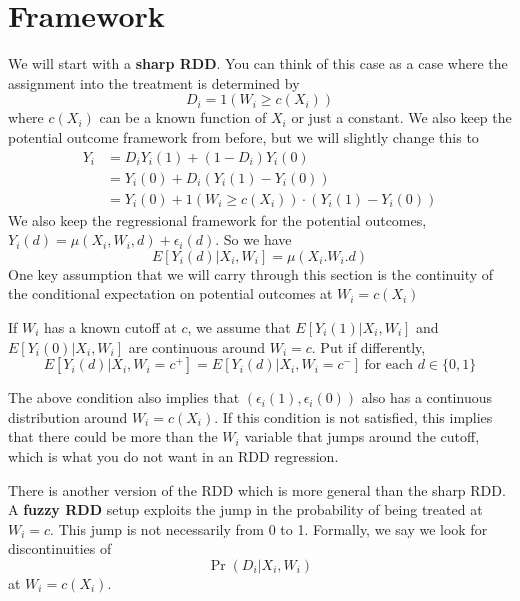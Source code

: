 \section{Framework}
We will start with a \textbf{sharp RDD}. You can think of this case as a case where the assignment into the treatment is determined by
\[
D_i=1(W_i\geq c(X_i))
\]
where $c(X_i)$ can be a known function of $X_i$ or just a constant. We also keep the potential outcome framework from before, but we will slightly change this to
\begin{align*}
Y_i& = D_iY_i(1)+(1-D_i)Y_i(0)\\
&=Y_i(0)+D_i(Y_i(1)-Y_i(0))\\
&=Y_i(0)+1(W_i\geq c(X_i))\cdot(Y_i(1)-Y_i(0))
\end{align*}
We also keep the regressional framework for the potential outcomes, $Y_i(d)=\mu(X_i,W_i,d)+\epsilon_i(d)$. So we have
\[
E[Y_i(d)|X_i,W_i]=\mu(X_i.W_i.d)
\]
One key assumption that we will carry through this section is the continuity of the conditional expectation on potential outcomes at $W_i=c(X_i)$
\begin{mdframed}[backgroundcolor=blue!5] 
\begin{assumption}[Continuity of $\mu(X_i,W_i,d)$ at $W_i=c$] If $W_i$ has a known cutoff at $c$, we assume that $E[Y_i(1)|X_i, W_i]$ and $E[Y_i(0)|X_i, W_i]$ are continuous around $W_i=c$. Put if differently, 
\[
E[Y_i(d)|X_i, W_i=c^+]=E[Y_i(d)|X_i, W_i=c^-] \ \text{for each } d\in\{0,1\}
\]
\end{assumption}
\end{mdframed}
The above condition also implies that $(\epsilon_i(1), \epsilon_i(0))$ also has a continuous distribution around $W_i=c(X_i)$. If this condition is not satisfied, this implies that there could be more than the $W_i$ variable that jumps around the cutoff, which is what you do not want in an RDD regression.  \par
There is another version of the RDD which is more general than the sharp RDD. A \textbf{fuzzy RDD} setup exploits the jump in the probability of being treated at $W_i=c$. This jump is not necessarily from 0 to 1. Formally, we say we look for discontinuities of 
\[
\Pr(D_i|X_i,W_i)
\]
at $W_i=c(X_i)$. 
